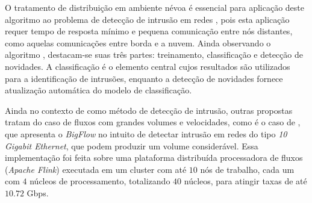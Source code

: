 O tratamento de distribuição em ambiente névoa é essencial para aplicação deste
algoritmo ao problema de detecção de intrusão em redes \iot, pois esta aplicação
requer tempo de resposta mínimo e pequena comunicação entre nós distantes, como
aquelas comunicações entre borda e a nuvem.
Ainda observando o algoritmo \minas, destacam-se suas três partes: treinamento,
classificação e detecção de novidades.
A classificação é o elemento central cujos resultados são utilizados
para a identificação de intrusões, enquanto a detecção de novidades fornece
atualização automática do modelo de classificação.

Ainda no contexto de \nd como método de detecção de intrusão, outras propostas
tratam do caso de fluxos com grandes volumes e velocidades, como é o caso de
, que apresenta o \emph{BigFlow} no intuito de detectar
intrusão em redes do tipo \emph{10 Gigabit Ethernet}, que podem produzir um
volume considerável.
Essa implementação foi feita sobre uma plataforma distribuída processadora de
fluxos (\emph{Apache Flink}) executada em um cluster com até $10$ nós de trabalho,
cada um com $4$ núcleos de processamento, totalizando $40$ núcleos, para atingir
taxas de até $10.72$ Gbps.



